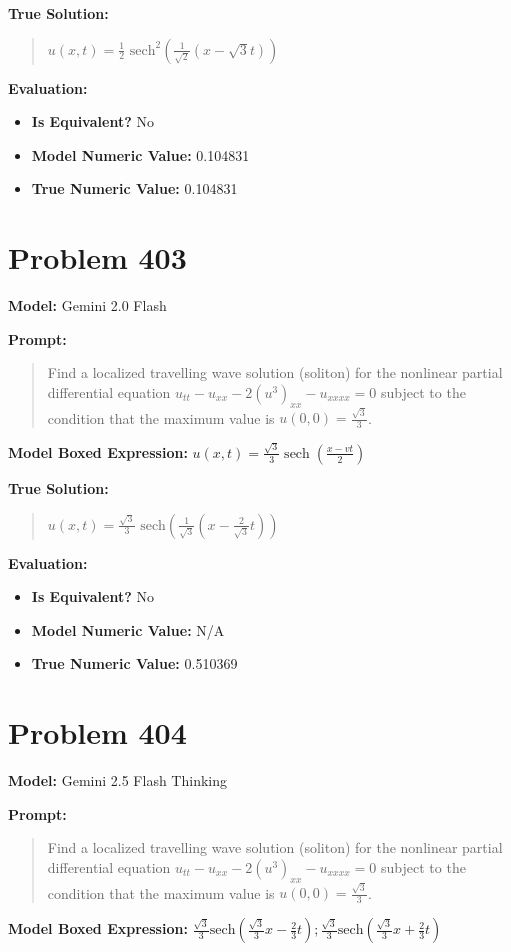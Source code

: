 \documentclass{article}
\begin{document}
\textbf{True Solution:}
\begin{quote}
$u(x,t) = \frac{1}{2} \text{ sech}^2(\frac{1}{\sqrt{2}} (x - \sqrt{3}t))$
\end{quote}

\textbf{Evaluation:}
\begin{itemize}
\item \textbf{Is Equivalent?} No
\item \textbf{Model Numeric Value:} 0.104831
\item \textbf{True Numeric Value:} 0.104831
\end{itemize}
\vspace{1cm}
\section*{Problem 403}
\textbf{Model:} Gemini 2.0 Flash

\textbf{Prompt:}
\begin{quote}
Find a localized travelling wave solution (soliton) for the nonlinear partial differential equation $u_{tt} - u_{xx} - 2 (u^3)_{xx} - u_{xxxx}=0$ subject to the condition that the maximum value is $u(0,0) = \frac{\sqrt{3}}{3}$.
\end{quote}
\textbf{Model Boxed Expression:} $u(x,t) = \frac{\sqrt{3}}{3} \operatorname{sech}\left(\frac{x-vt}{2}\right)$

\textbf{True Solution:}
\begin{quote}
$u(x,t) = \frac{\sqrt{3}}{3} \text{ sech}(\frac{1}{\sqrt{3}} (x - \frac{2}{\sqrt{3}}t))$
\end{quote}

\textbf{Evaluation:}
\begin{itemize}
\item \textbf{Is Equivalent?} No
\item \textbf{Model Numeric Value:} N/A
\item \textbf{True Numeric Value:} 0.510369
\end{itemize}
\vspace{1cm}
\section*{Problem 404}
\textbf{Model:} Gemini 2.5 Flash Thinking

\textbf{Prompt:}
\begin{quote}
Find a localized travelling wave solution (soliton) for the nonlinear partial differential equation $u_{tt} - u_{xx} - 2 (u^3)_{xx} - u_{xxxx}=0$ subject to the condition that the maximum value is $u(0,0) = \frac{\sqrt{3}}{3}$.
\end{quote}
\textbf{Model Boxed Expression:} $\frac{\sqrt{3}}{3} \text{sech}\left(\frac{\sqrt{3}}{3}x - \frac{2}{3}t\right) ; \frac{\sqrt{3}}{3} \text{sech}\left(\frac{\sqrt{3}}{3}x + \frac{2}{3}t\right)$
\end{document}
